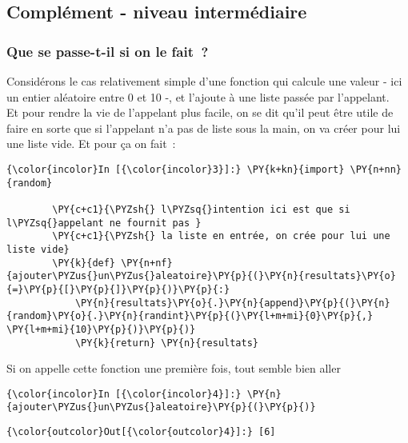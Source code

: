     \hypertarget{compluxe9ment---niveau-intermuxe9diaire}{%
\subsection{Complément - niveau
intermédiaire}\label{compluxe9ment---niveau-intermuxe9diaire}}

    \hypertarget{que-se-passe-t-il-si-on-le-fait}{%
\subsubsection{Que se passe-t-il si on le
fait~?}\label{que-se-passe-t-il-si-on-le-fait}}

    Considérons le cas relativement simple d'une fonction qui calcule une
valeur - ici un entier aléatoire entre 0 et 10 -, et l'ajoute à une
liste passée par l'appelant.\\

    Et pour rendre la vie de l'appelant plus facile, on se dit qu'il peut
être utile de faire en sorte que si l'appelant n'a pas de liste sous la
main, on va créer pour lui une liste vide. Et pour ça on fait~:

    \begin{Verbatim}[commandchars=\\\{\}]
{\color{incolor}In [{\color{incolor}3}]:} \PY{k+kn}{import} \PY{n+nn}{random}
        
        \PY{c+c1}{\PYZsh{} l\PYZsq{}intention ici est que si l\PYZsq{}appelant ne fournit pas }
        \PY{c+c1}{\PYZsh{} la liste en entrée, on crée pour lui une liste vide}
        \PY{k}{def} \PY{n+nf}{ajouter\PYZus{}un\PYZus{}aleatoire}\PY{p}{(}\PY{n}{resultats}\PY{o}{=}\PY{p}{[}\PY{p}{]}\PY{p}{)}\PY{p}{:}
            \PY{n}{resultats}\PY{o}{.}\PY{n}{append}\PY{p}{(}\PY{n}{random}\PY{o}{.}\PY{n}{randint}\PY{p}{(}\PY{l+m+mi}{0}\PY{p}{,} \PY{l+m+mi}{10}\PY{p}{)}\PY{p}{)}
            \PY{k}{return} \PY{n}{resultats}
\end{Verbatim}


    Si on appelle cette fonction une première fois, tout semble bien aller

    \begin{Verbatim}[commandchars=\\\{\}]
{\color{incolor}In [{\color{incolor}4}]:} \PY{n}{ajouter\PYZus{}un\PYZus{}aleatoire}\PY{p}{(}\PY{p}{)}
\end{Verbatim}


\begin{Verbatim}[commandchars=\\\{\}]
{\color{outcolor}Out[{\color{outcolor}4}]:} [6]
\end{Verbatim}
            

